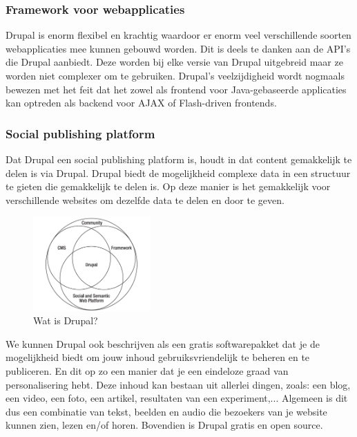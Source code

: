 \subsubsection{Framework voor webapplicaties}

Drupal is enorm flexibel en krachtig waardoor er enorm veel verschillende soorten webapplicaties mee kunnen gebouwd worden. Dit is deels te danken aan de API's die Drupal aanbiedt. Deze worden bij elke versie van Drupal uitgebreid maar ze worden niet complexer om te gebruiken. Drupal's veelzijdigheid wordt nogmaals bewezen met het feit dat het zowel als frontend voor Java-gebaseerde applicaties kan optreden als backend voor AJAX of Flash-driven frontends.

\subsubsection{Social publishing platform}

Dat Drupal een social publishing platform is, houdt in dat content gemakkelijk te delen is via Drupal. Drupal biedt de mogelijkheid complexe data in een structuur te gieten die gemakkelijk te delen is. Op deze manier is het gemakkelijk voor verschillende websites om dezelfde data te delen en door te geven.

\begin{figure}[h]
\centering
\includegraphics[width=0.4\textwidth]{fig/watIsDrupal}
\caption{Wat is Drupal?}
\vspace{-10pt}
\label{fig:watIsDrupal}
\end{figure}

We kunnen Drupal ook beschrijven als een gratis softwarepakket dat je de mogelijkheid biedt om jouw inhoud gebruiksvriendelijk te beheren en te publiceren. En dit op zo een manier dat je een eindeloze graad van personalisering hebt. Deze inhoud kan bestaan uit allerlei dingen, zoals: een blog, een video, een foto, een artikel, resultaten van een experiment,... Algemeen is dit dus een combinatie van tekst, beelden en audio die bezoekers van je website kunnen zien, lezen en/of horen. Bovendien is Drupal gratis en open source.

